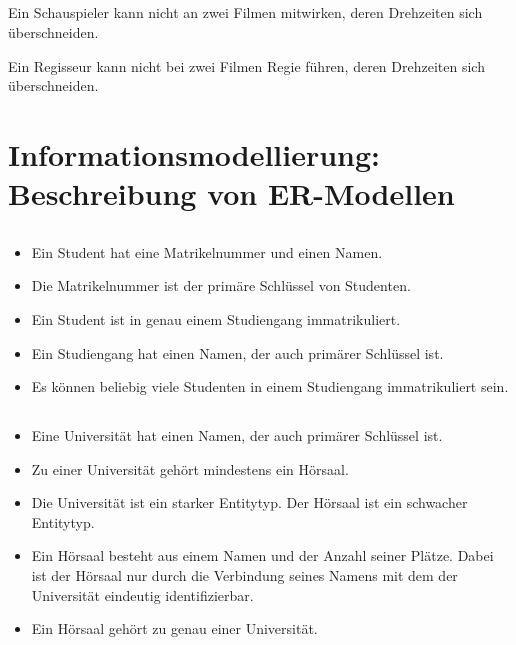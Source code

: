 \documentclass[ngerman]{gdb-aufgabenblatt}
\begin{document}
	\subsection{} %
	Ein Schauspieler kann nicht an zwei Filmen mitwirken, deren Drehzeiten sich überschneiden.
	
	Ein Regisseur kann nicht bei zwei Filmen Regie führen, deren Drehzeiten sich überschneiden.
\section{Informationsmodellierung: Beschreibung von ER-Modellen}
	\subsection{} %
		\begin{itemize}
			\item	Ein Student hat eine Matrikelnummer und einen Namen.
			\item	Die Matrikelnummer ist der primäre Schlüssel von Studenten.
			\item	Ein Student ist in genau einem Studiengang immatrikuliert.
			\item	Ein Studiengang hat einen Namen, der auch primärer Schlüssel ist.
			\item	Es können beliebig viele Studenten in einem Studiengang immatrikuliert sein.
		\end{itemize}
	\subsection{} %
		\begin{itemize}
			\item	Eine Universität hat einen Namen, der auch primärer Schlüssel ist.
			\item	Zu einer Universität gehört mindestens ein Hörsaal.
			\item	Die Universität ist ein starker Entitytyp. Der Hörsaal ist ein schwacher Entitytyp.
			\item	Ein Hörsaal besteht aus einem Namen und der Anzahl seiner Plätze. Dabei ist der Hörsaal nur durch die Verbindung seines Namens mit dem der Universität eindeutig identifizierbar.
			\item	Ein Hörsaal gehört zu genau einer Universität.
		\end{itemize}
\end{document}
